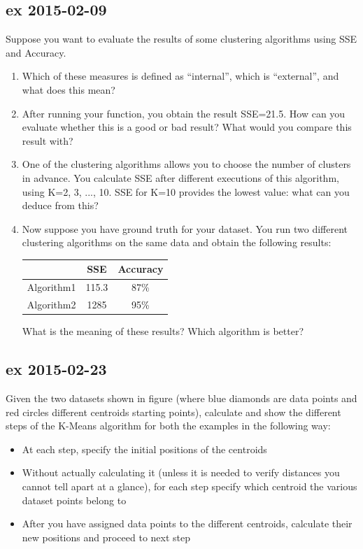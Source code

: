 \documentclass[a4paper,12pt,titlepage]{article} %
\begin{document}
\subsection{ex 2015-02-09}
Suppose you want to evaluate the results of some clustering algorithms using SSE and Accuracy.
\begin{enumerate}
\item Which of these measures is defined as “internal”, which is “external”, and what does this mean? 
\item After running your function, you obtain the result SSE=21.5. How can you evaluate whether this is a good or bad result? What would you compare this result with?
\item One of the clustering algorithms allows you to choose the number of clusters in advance. You calculate SSE after different executions of this algorithm, using K=2, 3, ..., 10. SSE for K=10 provides the lowest value: what can you deduce from this?
\item Now suppose you have ground truth for your dataset. You run two different clustering algorithms on the same data and obtain the following results:

\begin{center}
	\begin{tabular}{c|cc}
                & SSE & Accuracy\\
                \hline
                Algorithm1 & 115.3 & 87\% \\
                Algorithm2 & 1285 & 95\% \\
	\end{tabular}
\end{center}

What is the meaning of these results? Which algorithm is better?
\end{enumerate}

\subsection{ex 2015-02-23}
Given the two datasets shown in figure (where blue diamonds are data points and red circles different centroids starting points), calculate and show the different steps of the K-Means algorithm for both the examples in the following way:
\begin{itemize}
\item At each step, specify the initial positions of the centroids
\item Without actually calculating it (unless it is needed to verify distances you cannot tell apart at a glance), for each step specify which centroid the various dataset points belong to
\item After you have assigned data points to the different centroids, calculate their new positions and proceed to next step
\end{itemize}
\end{document}
